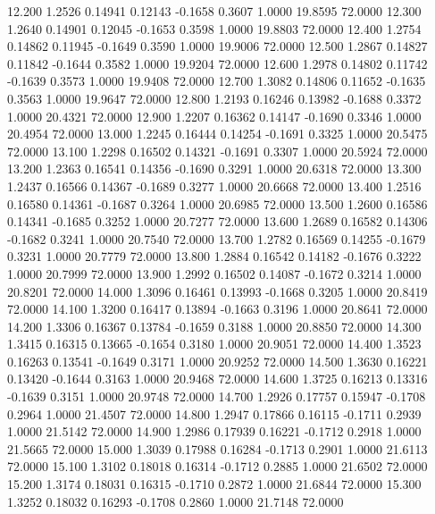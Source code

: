   12.200   1.2526   0.14941   0.12143  -0.1658   0.3607   1.0000  19.8595  72.0000
  12.300   1.2640   0.14901   0.12045  -0.1653   0.3598   1.0000  19.8803  72.0000
  12.400   1.2754   0.14862   0.11945  -0.1649   0.3590   1.0000  19.9006  72.0000
  12.500   1.2867   0.14827   0.11842  -0.1644   0.3582   1.0000  19.9204  72.0000
  12.600   1.2978   0.14802   0.11742  -0.1639   0.3573   1.0000  19.9408  72.0000
  12.700   1.3082   0.14806   0.11652  -0.1635   0.3563   1.0000  19.9647  72.0000
  12.800   1.2193   0.16246   0.13982  -0.1688   0.3372   1.0000  20.4321  72.0000
  12.900   1.2207   0.16362   0.14147  -0.1690   0.3346   1.0000  20.4954  72.0000
  13.000   1.2245   0.16444   0.14254  -0.1691   0.3325   1.0000  20.5475  72.0000
  13.100   1.2298   0.16502   0.14321  -0.1691   0.3307   1.0000  20.5924  72.0000
  13.200   1.2363   0.16541   0.14356  -0.1690   0.3291   1.0000  20.6318  72.0000
  13.300   1.2437   0.16566   0.14367  -0.1689   0.3277   1.0000  20.6668  72.0000
  13.400   1.2516   0.16580   0.14361  -0.1687   0.3264   1.0000  20.6985  72.0000
  13.500   1.2600   0.16586   0.14341  -0.1685   0.3252   1.0000  20.7277  72.0000
  13.600   1.2689   0.16582   0.14306  -0.1682   0.3241   1.0000  20.7540  72.0000
  13.700   1.2782   0.16569   0.14255  -0.1679   0.3231   1.0000  20.7779  72.0000
  13.800   1.2884   0.16542   0.14182  -0.1676   0.3222   1.0000  20.7999  72.0000
  13.900   1.2992   0.16502   0.14087  -0.1672   0.3214   1.0000  20.8201  72.0000
  14.000   1.3096   0.16461   0.13993  -0.1668   0.3205   1.0000  20.8419  72.0000
  14.100   1.3200   0.16417   0.13894  -0.1663   0.3196   1.0000  20.8641  72.0000
  14.200   1.3306   0.16367   0.13784  -0.1659   0.3188   1.0000  20.8850  72.0000
  14.300   1.3415   0.16315   0.13665  -0.1654   0.3180   1.0000  20.9051  72.0000
  14.400   1.3523   0.16263   0.13541  -0.1649   0.3171   1.0000  20.9252  72.0000
  14.500   1.3630   0.16221   0.13420  -0.1644   0.3163   1.0000  20.9468  72.0000
  14.600   1.3725   0.16213   0.13316  -0.1639   0.3151   1.0000  20.9748  72.0000
  14.700   1.2926   0.17757   0.15947  -0.1708   0.2964   1.0000  21.4507  72.0000
  14.800   1.2947   0.17866   0.16115  -0.1711   0.2939   1.0000  21.5142  72.0000
  14.900   1.2986   0.17939   0.16221  -0.1712   0.2918   1.0000  21.5665  72.0000
  15.000   1.3039   0.17988   0.16284  -0.1713   0.2901   1.0000  21.6113  72.0000
  15.100   1.3102   0.18018   0.16314  -0.1712   0.2885   1.0000  21.6502  72.0000
  15.200   1.3174   0.18031   0.16315  -0.1710   0.2872   1.0000  21.6844  72.0000
  15.300   1.3252   0.18032   0.16293  -0.1708   0.2860   1.0000  21.7148  72.0000
